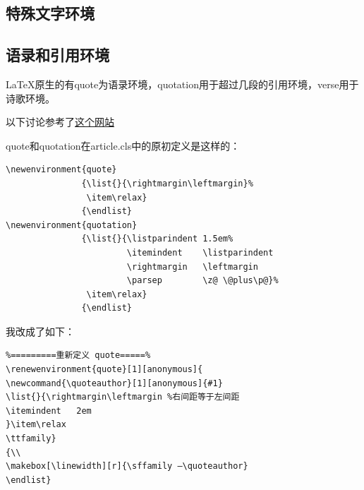 \documentclass[12pt,oneside]{book}
\begin{document}
\begin{common-format}
\section{特殊文字环境}
\subsection{语录和引用环境}
\LaTeX 原生的有quote为语录环境，quotation用于超过几段的引用环境，verse用于诗歌环境。

以下讨论参考了\href{http://tex.stackexchange.com/questions/33219/whats-the-difference-between-the-environments-quote-and-quotation}{这个网站}

quote和quotation在article.cls中的原初定义是这样的：
\begin{Verbatim}
\newenvironment{quote}
               {\list{}{\rightmargin\leftmargin}%
                \item\relax}
               {\endlist}
\newenvironment{quotation}
               {\list{}{\listparindent 1.5em%
                        \itemindent    \listparindent
                        \rightmargin   \leftmargin
                        \parsep        \z@ \@plus\p@}%
                \item\relax}
               {\endlist}
\end{Verbatim}

我改成了如下：
\begin{Verbatim}
%=========重新定义 quote=====%
\renewenvironment{quote}[1][anonymous]{
\newcommand{\quoteauthor}[1][anonymous]{#1}
\list{}{\rightmargin\leftmargin %右间距等于左间距
\itemindent   2em
}\item\relax
\ttfamily}
{\\
\makebox[\linewidth][r]{\sffamily —\quoteauthor}
\endlist}


\end{Verbatim}
\end{common-format}
\end{document}
